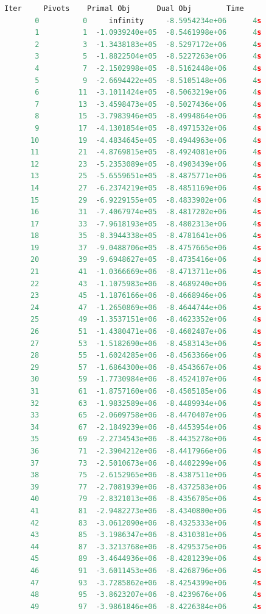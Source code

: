 \documentclass{write_paper}
\begin{document}
\begin{lstlisting}[language=python]
    Iter     Pivots    Primal Obj      Dual Obj        Time
       0          0     infinity     -8.5954234e+06      4s
       1          1  -1.0939240e+05  -8.5461998e+06      4s
       2          3  -1.3438183e+05  -8.5297172e+06      4s
       3          5  -1.8822504e+05  -8.5227263e+06      4s
       4          7  -2.1502998e+05  -8.5162448e+06      4s
       5          9  -2.6694422e+05  -8.5105148e+06      4s
       6         11  -3.1011424e+05  -8.5063219e+06      4s
       7         13  -3.4598473e+05  -8.5027436e+06      4s
       8         15  -3.7983946e+05  -8.4994864e+06      4s
       9         17  -4.1301854e+05  -8.4971532e+06      4s
      10         19  -4.4834645e+05  -8.4944963e+06      4s
      11         21  -4.8769815e+05  -8.4924081e+06      4s
      12         23  -5.2353089e+05  -8.4903439e+06      4s
      13         25  -5.6559651e+05  -8.4875771e+06      4s
      14         27  -6.2374219e+05  -8.4851169e+06      4s
      15         29  -6.9229155e+05  -8.4833902e+06      4s
      16         31  -7.4067974e+05  -8.4817202e+06      4s
      17         33  -7.9618193e+05  -8.4802313e+06      4s
      18         35  -8.3944338e+05  -8.4781641e+06      4s
      19         37  -9.0488706e+05  -8.4757665e+06      4s
      20         39  -9.6948627e+05  -8.4735416e+06      4s
      21         41  -1.0366669e+06  -8.4713711e+06      4s
      22         43  -1.1075983e+06  -8.4689240e+06      4s
      23         45  -1.1876166e+06  -8.4668946e+06      4s
      24         47  -1.2650869e+06  -8.4644744e+06      4s
      25         49  -1.3537151e+06  -8.4623352e+06      4s
      26         51  -1.4380471e+06  -8.4602487e+06      4s
      27         53  -1.5182690e+06  -8.4583143e+06      4s
      28         55  -1.6024285e+06  -8.4563366e+06      4s
      29         57  -1.6864300e+06  -8.4543667e+06      4s
      30         59  -1.7730984e+06  -8.4524107e+06      4s
      31         61  -1.8757160e+06  -8.4505185e+06      4s
      32         63  -1.9832589e+06  -8.4489934e+06      4s
      33         65  -2.0609758e+06  -8.4470407e+06      4s
      34         67  -2.1849239e+06  -8.4453954e+06      4s
      35         69  -2.2734543e+06  -8.4435278e+06      4s
      36         71  -2.3904212e+06  -8.4417966e+06      4s
      37         73  -2.5010673e+06  -8.4402299e+06      4s
      38         75  -2.6152965e+06  -8.4387511e+06      4s
      39         77  -2.7081939e+06  -8.4372583e+06      4s
      40         79  -2.8321013e+06  -8.4356705e+06      4s
      41         81  -2.9482273e+06  -8.4340800e+06      4s
      42         83  -3.0612090e+06  -8.4325333e+06      4s
      43         85  -3.1986347e+06  -8.4310381e+06      4s
      44         87  -3.3213768e+06  -8.4295375e+06      4s
      45         89  -3.4644936e+06  -8.4281239e+06      4s
      46         91  -3.6011453e+06  -8.4268796e+06      4s
      47         93  -3.7285862e+06  -8.4254399e+06      4s
      48         95  -3.8623207e+06  -8.4239676e+06      4s
      49         97  -3.9861846e+06  -8.4226384e+06      4s


\end{lstlisting}
\end{document}
